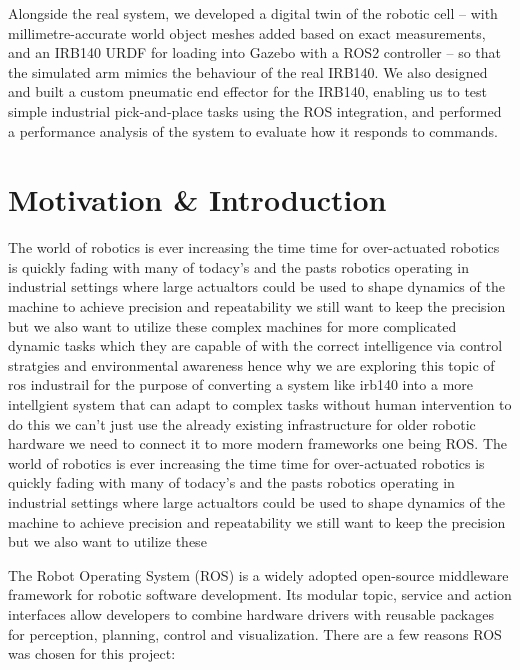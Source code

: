 \documentclass[11pt,a4paper]{report}
\begin{document}
Alongside the real system, we developed a digital twin of the robotic cell -- with millimetre-accurate
world object meshes added based on exact measurements, and an IRB140 URDF for loading into Gazebo
with a ROS2 controller -- so that the simulated arm mimics the behaviour of the real IRB140. We also
designed and built a custom pneumatic end effector for the IRB140, enabling us to test simple
industrial pick-and-place tasks using the ROS integration, and performed a performance analysis of
the system to evaluate how it responds to commands.

\cleardoublepage
\tableofcontents
\cleardoublepage
{}
{}
\listoffigures
\cleardoublepage
{}

\chapter{Motivation \& Introduction}

The world of robotics is ever increasing the time time for over-actuated robotics is quickly fading
with many of todacy's and the pasts robotics operating in industrial settings where large actualtors could 
be used to shape dynamics of the machine to achieve precision and repeatability we still want to keep 
the precision but we also want to utilize these complex machines for more complicated dynamic 
tasks which they are capable of with the correct intelligence via control stratgies and environmental 
awareness hence why we are exploring this topic of ros industrail for the purpose 
of converting a system like irb140 into a more intellgient system that can adapt to complex tasks
without human intervention to do this we can't just use the already existing infrastructure for 
older robotic hardware we need to connect it to more modern frameworks one being ROS. The world of robotics is ever increasing the time time for over-actuated robotics is quickly fading
with many of todacy's and the pasts robotics operating in industrial settings where large actualtors could 
be used to shape dynamics of the machine to achieve precision and repeatability we still want to keep 
the precision but we also want to utilize these 

The Robot Operating System (ROS) is a widely adopted open-source middleware framework for
robotic software development. Its modular topic, service and action interfaces allow developers
to combine hardware drivers with reusable packages for perception, planning, control and
visualization. There are a few reasons ROS was chosen for this project:
\end{document}
